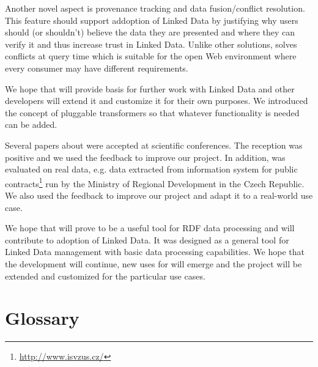 Another novel aspect is provenance tracking and data fusion/conflict resolution. This feature should support addoption of Linked Data by justifying why users should (or shouldn't) believe the data they are presented and where they can verify it and thus increase trust in Linked Data. Unlike other solutions, \odcs solves conflicts at query time which is suitable for the open Web environment where every consumer may have different requirements.

We hope that \odcs will provide basis for further work with Linked Data and other developers will extend it and customize it for their own purposes. We introduced the concept of pluggable transformers so that whatever functionality is needed can be added.

Several papers about \odcs were accepted at scientific conferences. The reception was positive and we used the feedback to improve our project. In addition, \odcs was evaluated on real data, e.g. data extracted from information system for public contracts\footnote{\url{http://www.isvzus.cz/}} run by the Ministry of Regional Development in the Czech Republic. We also used the feedback to improve our project and adapt it to a real-world use case.

We hope that \odcs will prove to be a useful tool for RDF data processing and will contribute to adoption of Linked Data. It was designed as a general tool for Linked Data management with basic data processing capabilities. We hope that the development will continue, new uses for \odcs will emerge and the project will be extended and customized for the particular use cases.




\appendix

\chapter{Glossary}
\label{chap:glossary}



